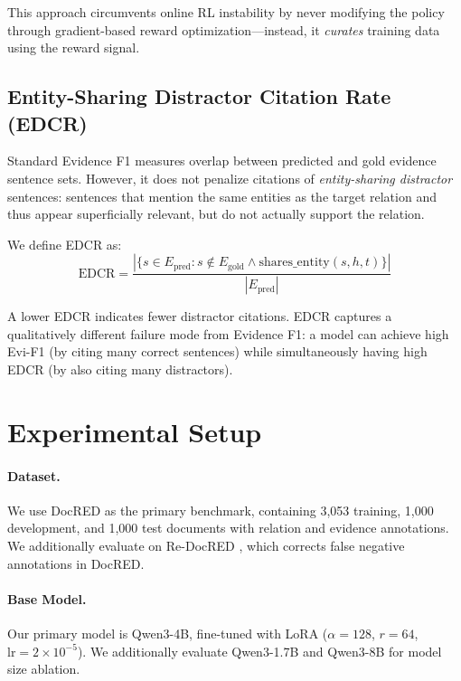 \documentclass[11pt,a4paper]{article}
\begin{document}
This approach circumvents online RL instability by never modifying the policy through gradient-based reward optimization---instead, it \emph{curates} training data using the reward signal.

\subsection{Entity-Sharing Distractor Citation Rate (EDCR)}
\label{sec:edcr_method}

Standard Evidence F1 measures overlap between predicted and gold evidence sentence sets.
However, it does not penalize citations of \emph{entity-sharing distractor} sentences: sentences that mention the same entities as the target relation and thus appear superficially relevant, but do not actually support the relation.

We define EDCR as:
\begin{equation}
    \text{EDCR} = \frac{|\{s \in E_{\text{pred}} : s \notin E_{\text{gold}} \wedge \text{shares\_entity}(s, h, t)\}|}{|E_{\text{pred}}|}
\end{equation}

A lower EDCR indicates fewer distractor citations.
EDCR captures a qualitatively different failure mode from Evidence F1: a model can achieve high Evi-F1 (by citing many correct sentences) while simultaneously having high EDCR (by also citing many distractors).

\section{Experimental Setup}
\label{sec:setup}

\paragraph{Dataset.}
We use DocRED \citep{yao2019docred} as the primary benchmark, containing 3,053 training, 1,000 development, and 1,000 test documents with relation and evidence annotations.
We additionally evaluate on Re-DocRED \citep{tan2022revisiting}, which corrects false negative annotations in DocRED.

\paragraph{Base Model.}
Our primary model is Qwen3-4B, fine-tuned with LoRA ($\alpha=128$, $r=64$, $\text{lr}=2\times10^{-5}$).
We additionally evaluate Qwen3-1.7B and Qwen3-8B for model size ablation.
\end{document}
